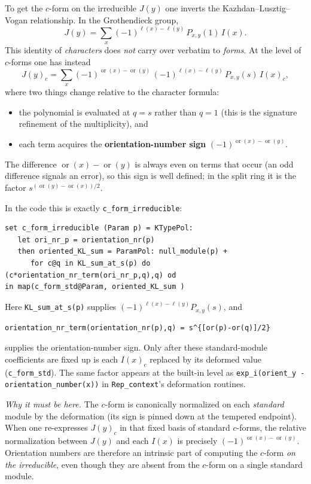 \documentclass[11pt]{article}
\newcommand{\orr}{\operatorname{or}}
\begin{document}
To get the $c$-form on the irreducible $J(y)$ one inverts the
Kazhdan--Lusztig--Vogan relationship.  In the Grothendieck group,
\begin{equation}
  J(y)=\sum_x (-1)^{\ell(x)-\ell(y)}\,P_{x,y}(1)\,I(x).
\end{equation}
This identity of \emph{characters} does \emph{not} carry over verbatim to
\emph{forms}.  At the level of $c$-forms one has instead
\begin{equation}\label{eq:cform-irr}
  J(y)_c=\sum_x (-1)^{\orr(x)-\orr(y)}\,(-1)^{\ell(x)-\ell(y)}\,P_{x,y}(s)\,I(x)_c,
\end{equation}
where two things change relative to the character formula:
\begin{itemize}
  \item the polynomial is evaluated at $q=s$ rather than $q=1$ (this is the
        signature refinement of the multiplicity), and
  \item each term acquires the \textbf{orientation-number sign}
        $(-1)^{\orr(x)-\orr(y)}$.
\end{itemize}
The difference $\orr(x)-\orr(y)$ is always even on terms that occur (an odd
difference signals an error), so this sign is well defined; in the split ring it
is the factor $s^{(\orr(y)-\orr(x))/2}$.

In the code this is exactly \texttt{c\_form\_irreducible}:
\begin{verbatim}
set c_form_irreducible (Param p) = KTypePol:
   let ori_nr_p = orientation_nr(p)
   then oriented_KL_sum = ParamPol: null_module(p) +
      for c@q in KL_sum_at_s(p) do (c*orientation_nr_term(ori_nr_p,q),q) od
in map(c_form_std@Param, oriented_KL_sum )
\end{verbatim}
Here \texttt{KL\_sum\_at\_s(p)} supplies $(-1)^{\ell(x)-\ell(y)}P_{x,y}(s)$, and
\begin{verbatim}
orientation_nr_term(orientation_nr(p),q) = s^{[or(p)-or(q)]/2}
\end{verbatim}
supplies the orientation-number sign.  Only after these standard-module
coefficients are fixed up is each $I(x)_c$ replaced by its deformed value
(\texttt{c\_form\_std}).  The same factor appears at the built-in level as
\texttt{exp\_i(orient\_y - orientation\_number(x))} in
\texttt{Rep\_context}'s deformation routines.

\medskip
\noindent
\emph{Why it must be here.}  The $c$-form is canonically normalized on each
\emph{standard} module by the deformation (its sign is pinned down at the
tempered endpoint).  When one re-expresses $J(y)_c$ in that fixed basis of
standard $c$-forms, the relative normalization between $J(y)$ and each $I(x)$ is
precisely $(-1)^{\orr(x)-\orr(y)}$.  Orientation numbers are therefore an
intrinsic part of computing the $c$-form \emph{on the irreducible}, even though
they are absent from the $c$-form on a single standard module.
\end{document}
